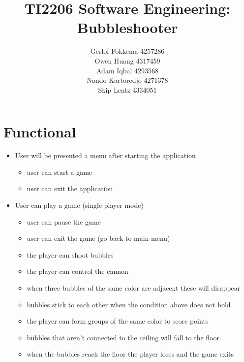 \documentclass[a4paper,11pt]{article}
\title{TI2206 Software Engineering: Bubbleshooter}
\author{Gerlof Fokkema 4257286 \\
	Owen Huang 4317459 \\
	Adam Iqbal 4293568 \\
	Nando Kartoredjo 4271378 \\
	Skip Lentz 4334051 \\
}
\begin{document}
\newpage
\section*{Functional}
\begin{itemize}
  \item User will be presented a menu after starting the application
  \begin{itemize}
    \item user can start a game
    \item user can exit the application
  \end{itemize}
  \item User can play a game (single player mode)
  \begin{itemize}
    \item user can pause the game
    \item user can exit the game (go back to main menu)
    \item the player can shoot bubbles
    \item the player can control the cannon
    \item when three bubbles of the same color are adjacent these will disappear
    \item bubbles stick to each other when the condition above does not hold
    \item the player can form groups of the same color to score points
    \item bubbles that aren't connected to the ceiling will fall to the floor
    \item when the bubbles reach the floor the player loses and the game exits
  \end{itemize}
\end{itemize}

\newpage
\end{document}
